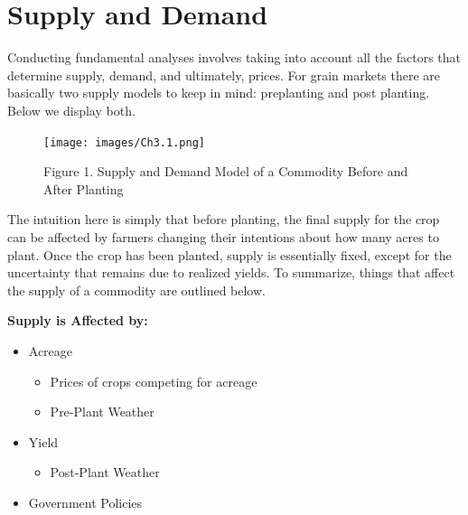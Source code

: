 \documentclass[
  letterpaper,
  DIV=11,
  numbers=noendperiod]{scrreprt}
\providecommand{\tightlist}{%
  \setlength{\itemsep}{0pt}\setlength{\parskip}{0pt}}\usepackage{longtable,booktabs,array}
\begin{document}
\section{Supply and Demand}\label{supply-and-demand}

Conducting fundamental analyses involves taking into account all the
factors that determine supply, demand, and ultimately, prices. For grain
markets there are basically two supply models to keep in mind:
preplanting and post planting. Below we display both.

\begin{figure}[H]

{\centering \texttt{[image: images/Ch3.1.png]}

}

\caption{Figure 1. Supply and Demand Model of a Commodity Before and
After Planting}

\end{figure}%

The intuition here is simply that before planting, the final supply for
the crop can be affected by farmers changing their intentions about how
many acres to plant. Once the crop has been planted, supply is
essentially fixed, except for the uncertainty that remains due to
realized yields. To summarize, things that affect the supply of a
commodity are outlined below.

\textbf{Supply is Affected by:}

\begin{itemize}
\item
  Acreage

  \begin{itemize}
  \tightlist
  \item
    Prices of crops competing for acreage
  \item
    Pre-Plant Weather
  \end{itemize}
\item
  Yield

  \begin{itemize}
  \tightlist
  \item
    Post-Plant Weather
  \end{itemize}
\item
  Government Policies
\end{itemize}
\end{document}
